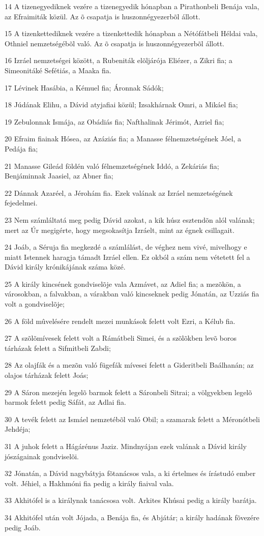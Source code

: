 \par 14 A tizenegyediknek vezére a tizenegyedik hónapban a Pirathonbeli Benája vala, az Efraimiták közül. Az õ csapatja is huszonnégyezerbõl állott.
\par 15 A tizenkettediknek vezére a tizenkettedik hónapban a Nétófátbeli Héldai vala, Othniel nemzetségébõl való. Az õ csapatja is huszonnégyezerbõl állott.
\par 16 Izráel nemzetségei között, a Rubeniták elõljárója Eliézer, a Zikri fia; a Simeonitáké Sefétiás, a Maaka fia.
\par 17 Lévinek Hasábia, a Kémuel fia; Áronnak Sádók;
\par 18 Júdának Elihu, a Dávid atyjafiai közül; Izsakhárnak Omri, a Mikáel fia;
\par 19 Zebulonnak Ismája, az Obádiás fia; Nafthalinak Jérimót, Azriel fia;
\par 20 Efraim fiainak Hósea, az Azáziás fia; a Manasse félnemzetségének Jóel, a Pedája fia;
\par 21 Manasse Gileád földén való félnemzetségének Iddó, a Zekáriás fia; Benjáminnak Jaasiel, az Abner fia;
\par 22 Dánnak Azaréel, a Jérohám fia. Ezek valának az Izráel nemzetségének fejedelmei.
\par 23 Nem számláltatá meg pedig Dávid azokat, a kik húsz esztendõn alól valának; mert az Úr megigérte, hogy megsokasítja Izráelt, mint az égnek csillagait.
\par 24 Joáb, a Séruja fia megkezdé a számlálást, de véghez nem vivé, mivelhogy e miatt Istennek haragja támadt Izráel ellen. Ez okból a szám nem vétetett fel a Dávid király krónikájának száma közé.
\par 25 A király kincsének gondviselõje vala Azmávet, az Adiel fia; a mezõkön, a városokban, a falvakban, a várakban való kincseknek pedig Jónatán, az Uzziás fia volt a gondviselõje;
\par 26 A föld mûvelésére rendelt mezei munkások felett volt Ezri, a Kélub fia.
\par 27 A szõlõmívesek felett volt a Rámátbeli Simei, és a szõlõkben levõ boros tárházak felett a Sifmitbeli Zabdi;
\par 28 Az olajfák és a mezõn való fügefák mívesei felett a Gideritbeli Baálhanán; az olajos tárházak felett Joás;
\par 29 A Sáron mezején legelõ barmok felett a Sáronbeli Sitrai; a völgyekben legelõ barmok felett pedig Sáfát, az Adlai fia.
\par 30 A tevék felett az Ismáel nemzetébõl való Obil; a szamarak felett a Méronótbeli Jehdéja;
\par 31 A juhok felett a Hágárénus Jaziz. Mindnyájan ezek valának a Dávid király jószágainak gondviselõi.
\par 32 Jónatán, a Dávid nagybátyja fõtanácsos vala, a ki értelmes és írástudó ember volt. Jéhiel, a Hakhmóni fia pedig a király fiaival vala.
\par 33 Akhitófel is a királynak tanácsosa volt. Arkites Khúsai pedig  a király barátja.
\par 34 Akhitófel után volt Jójada, a Benája fia, és Abjátár; a király hadának fõvezére pedig Joáb.

